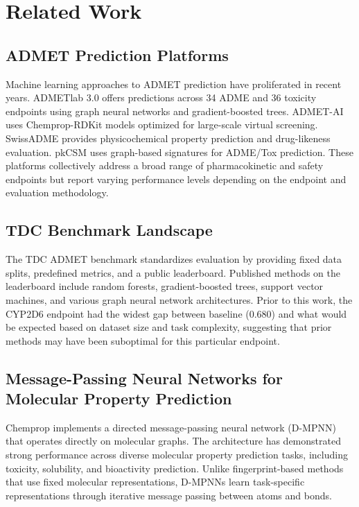 \documentclass[11pt]{article}
\begin{document}
\section{Related Work}

\subsection{ADMET Prediction Platforms}

Machine learning approaches to ADMET prediction have proliferated in recent years. ADMETlab 3.0 \citep{fu2024admetlab} offers predictions across 34 ADME and 36 toxicity endpoints using graph neural networks and gradient-boosted trees. ADMET-AI \citep{swanson2023admetai} uses Chemprop-RDKit models optimized for large-scale virtual screening. SwissADME \citep{daina2017swissadme} provides physicochemical property prediction and drug-likeness evaluation. pkCSM \citep{pires2015pkcsm} uses graph-based signatures for ADME/Tox prediction. These platforms collectively address a broad range of pharmacokinetic and safety endpoints but report varying performance levels depending on the endpoint and evaluation methodology.

\subsection{TDC Benchmark Landscape}

The TDC ADMET benchmark \citep{huang2021therapeutics} standardizes evaluation by providing fixed data splits, predefined metrics, and a public leaderboard. Published methods on the leaderboard include random forests, gradient-boosted trees, support vector machines, and various graph neural network architectures. Prior to this work, the CYP2D6 endpoint had the widest gap between baseline (0.680) and what would be expected based on dataset size and task complexity, suggesting that prior methods may have been suboptimal for this particular endpoint.

\subsection{Message-Passing Neural Networks for Molecular Property Prediction}

Chemprop \citep{yang2019analyzing} implements a directed message-passing neural network (D-MPNN) that operates directly on molecular graphs. The architecture has demonstrated strong performance across diverse molecular property prediction tasks, including toxicity, solubility, and bioactivity prediction. Unlike fingerprint-based methods that use fixed molecular representations, D-MPNNs learn task-specific representations through iterative message passing between atoms and bonds.
\end{document}
